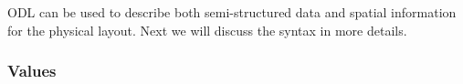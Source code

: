 ODL can be used to describe both semi-structured data and 
spatial information for the physical layout. Next we 
will discuss the syntax in more details. 

\subsubsection{Values}



